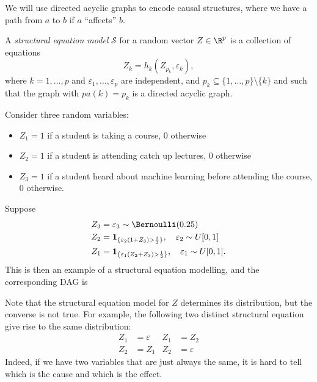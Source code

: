 \documentclass[a4paper]{article}
\begin{document}
We will use directed acyclic graphs to encode causal structures, where we have a path from $a$ to $b$ if $a$ ``affects'' $b$.

\begin{defi}
  A \emph{structural equation model} $\mathcal{S}$ for a random vector $Z \in \R^p$ is a collection of equations
  \[
    Z_k = h_k(Z_{p_k}, \varepsilon_k),
  \]
  where $k = 1, \ldots, p$ and $\varepsilon_1, \ldots, \varepsilon_p$ are independent, and $p_k \subseteq \{1, \ldots, p\} \setminus \{k\}$ and such that the graph with $pa(k) = p_k$ is a directed acyclic graph.
\end{defi}

\begin{eg}
  Consider three random variables:
  \begin{itemize}
    \item $Z_1 = 1$ if a student is taking a course, $0$ otherwise
    \item $Z_2 = 1$ if a student is attending catch up lectures, $0$ otherwise
    \item $Z_3 = 1$ if a student heard about machine learning before attending the course, $0$ otherwise.
  \end{itemize}
  Suppose
  \begin{align*}
    Z_3 &= \varepsilon_3 \sim \Bernoulli(0.25)\\
    Z_2 &= \mathbf{1}_{\{\varepsilon_2(1 + Z_3) > \frac{1}{2}\}},\quad \varepsilon_2 \sim U[0, 1]\\
    Z_1 &= \mathbf{1}_{\{\varepsilon_1(Z_2 + Z_3) > \frac{1}{2}\}},\quad \varepsilon_1 \sim U[0, 1].
  \end{align*}
  This is then an example of a structural equation modelling, and the corresponding DAG is
  \begin{center}
  \end{center}
\end{eg}
Note that the structural equation model for $Z$ determines its distribution, but the converse is not true. For example, the following two distinct structural equation give rise to the same distribution:
\begin{align*}
  Z_1 &= \varepsilon & Z_1 &= Z_2\\
  Z_2 &= Z_1 & Z_2 &= \varepsilon
\end{align*}
Indeed, if we have two variables that are just always the same, it is hard to tell which is the cause and which is the effect.
\end{document}
